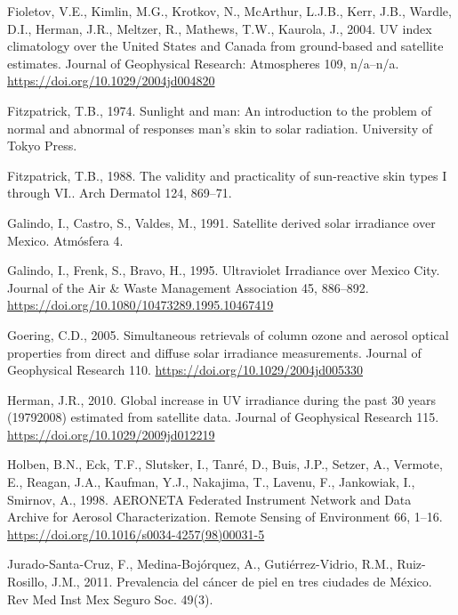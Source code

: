 \documentclass[10pt]{article}
\begin{document}
\label{csl:55}Fioletov, V.E., Kimlin, M.G., Krotkov, N., McArthur, L.J.B., Kerr, J.B., Wardle, D.I., Herman, J.R., Meltzer, R., Mathews, T.W., Kaurola, J., 2004. {{UV} index climatology over the United States and Canada from ground-based and satellite estimates}. Journal of Geophysical Research: Atmospheres 109, n/a--n/a. \url{https://doi.org/10.1029/2004jd004820}

\label{csl:22}Fitzpatrick, T.B., 1974. {Sunlight and man: An introduction to the problem of normal and abnormal of responses man's skin to solar radiation}. University of Tokyo Press.

\label{csl:30}Fitzpatrick, T.B., 1988. {The validity and practicality of sun-reactive skin types I through VI.}. Arch Dermatol 124, 869–71.

\label{csl:15}Galindo, I., Castro, S., Valdes, M., 1991. {Satellite derived solar irradiance over Mexico}. Atmósfera 4.

\label{csl:19}Galindo, I., Frenk, S., Bravo, H., 1995. {Ultraviolet Irradiance over Mexico City}. Journal of the Air {\&} Waste Management Association 45, 886–892. \url{https://doi.org/10.1080/10473289.1995.10467419}

\label{csl:20}Goering, C.D., 2005. {Simultaneous retrievals of column ozone and aerosol optical properties from direct and diffuse solar irradiance measurements}. Journal of Geophysical Research 110. \url{https://doi.org/10.1029/2004jd005330}

\label{csl:28}Herman, J.R., 2010. {Global increase in {UV} irradiance during the past 30 years (1979{\textendash}2008) estimated from satellite data}. Journal of Geophysical Research 115. \url{https://doi.org/10.1029/2009jd012219}

\label{csl:63}Holben, B.N., Eck, T.F., Slutsker, I., Tanr{\'{e}}, D., Buis, J.P., Setzer, A., Vermote, E., Reagan, J.A., Kaufman, Y.J., Nakajima, T., Lavenu, F., Jankowiak, I., Smirnov, A., 1998. {{AERONET}{\textemdash}A Federated Instrument Network and Data Archive for Aerosol Characterization}. Remote Sensing of Environment 66, 1–16. \url{https://doi.org/10.1016/s0034-4257(98)00031-5}

\label{csl:36}Jurado-Santa-Cruz, F., Medina-Bojórquez, A., Gutiérrez-Vidrio, R.M., Ruiz-Rosillo, J.M., 2011. {Prevalencia del cáncer de piel en tres ciudades de México}. Rev Med Inst Mex Seguro Soc. 49(3).
\end{document}
